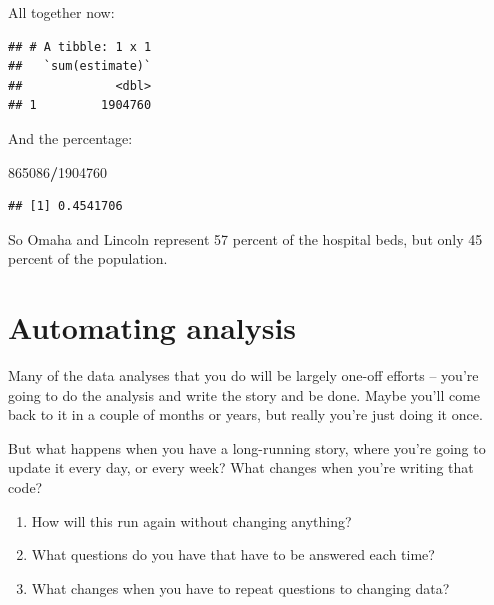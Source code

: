 \documentclass[]{book}
\newenvironment{Shaded}{\begin{snugshade}}{\end{snugshade}}
\newcommand{\DecValTok}[1]{\textcolor[rgb]{0.00,0.00,0.81}{#1}}
\newcommand{\KeywordTok}[1]{\textcolor[rgb]{0.13,0.29,0.53}{\textbf{#1}}}
\newcommand{\NormalTok}[1]{#1}
\newcommand{\OperatorTok}[1]{\textcolor[rgb]{0.81,0.36,0.00}{\textbf{#1}}}
\newcommand{\StringTok}[1]{\textcolor[rgb]{0.31,0.60,0.02}{#1}}
\providecommand{\tightlist}{%
  \setlength{\itemsep}{0pt}\setlength{\parskip}{0pt}}
\begin{document}
All together now:

\begin{Shaded}
\end{Shaded}

\begin{verbatim}
## # A tibble: 1 x 1
##   `sum(estimate)`
##             <dbl>
## 1         1904760
\end{verbatim}

And the percentage:

\begin{Shaded}
\begin{Highlighting}[]
\DecValTok{865086}\OperatorTok{/}\DecValTok{1904760}
\end{Highlighting}
\end{Shaded}

\begin{verbatim}
## [1] 0.4541706
\end{verbatim}

So Omaha and Lincoln represent 57 percent of the hospital beds, but only 45 percent of the population.

\hypertarget{automating-analysis}{%
\chapter{Automating analysis}\label{automating-analysis}}

Many of the data analyses that you do will be largely one-off efforts -- you're going to do the analysis and write the story and be done. Maybe you'll come back to it in a couple of months or years, but really you're just doing it once.

But what happens when you have a long-running story, where you're going to update it every day, or every week? What changes when you're writing that code?

\begin{enumerate}
\def\labelenumi{\arabic{enumi}.}
\tightlist
\item
  How will this run again without changing anything?
\item
  What questions do you have that have to be answered each time?
\item
  What changes when you have to repeat questions to changing data?
\end{enumerate}
\end{document}
